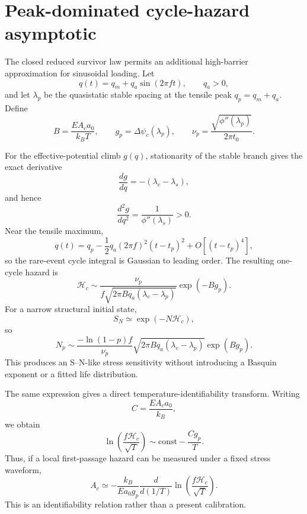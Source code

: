 
\section*{Peak-dominated cycle-hazard asymptotic}

The closed reduced survivor law permits an additional high-barrier approximation for sinusoidal loading. Let
\begin{equation}
q(t)=q_m+q_a\sin(2\pi f t),
\qquad q_a>0,
\end{equation}
and let $\lambda_p$ be the quasistatic stable spacing at the tensile peak $q_p=q_m+q_a$. Define
\begin{equation}
B=\frac{EA_ca_0}{k_BT},
\qquad
g_p=\Delta\psi_c(\lambda_p),
\qquad
\nu_p=\frac{\sqrt{\phi''(\lambda_p)}}{2\pi t_0}.
\end{equation}

For the effective-potential climb $g(q)$, stationarity of the stable branch gives the exact derivative
\begin{equation}
\frac{dg}{dq}=-(\lambda_c-\lambda_s),
\end{equation}
and hence
\begin{equation}
\frac{d^2g}{dq^2}=\frac{1}{\phi''(\lambda_s)}>0.
\end{equation}
Near the tensile maximum,
\begin{equation}
q(t)=q_p-\frac12q_a(2\pi f)^2(t-t_p)^2+O[(t-t_p)^4],
\end{equation}
so the rare-event cycle integral is Gaussian to leading order. The resulting one-cycle hazard is
\begin{equation}
\boxed{
\mathcal H_c
\sim
\frac{\nu_p}{f\sqrt{2\pi Bq_a(\lambda_c-\lambda_p)}}
\exp(-Bg_p).
}
\end{equation}
For a narrow structural initial state,
\begin{equation}
S_N\simeq\exp(-N\mathcal H_c),
\end{equation}
so
\begin{equation}
N_p
\sim
\frac{-\ln(1-p)f}{\nu_p}
\sqrt{2\pi Bq_a(\lambda_c-\lambda_p)}
\exp(Bg_p).
\end{equation}
This produces an S--N-like stress sensitivity without introducing a Basquin exponent or a fitted life distribution.

The same expression gives a direct temperature-identifiability transform. Writing
\begin{equation}
C=\frac{EA_ca_0}{k_B},
\end{equation}
we obtain
\begin{equation}
\boxed{
\ln\left(\frac{f\mathcal H_c}{\sqrt T}\right)
\sim
\mathrm{const}
-\frac{Cg_p}{T}.
}
\end{equation}
Thus, if a local first-passage hazard can be measured under a fixed stress waveform,
\begin{equation}
\boxed{
A_c
\simeq
-\frac{k_B}{Ea_0g_p}
\frac{d}{d(1/T)}
\ln\left(\frac{f\mathcal H_c}{\sqrt T}\right).
}
\end{equation}
This is an identifiability relation rather than a present calibration.

